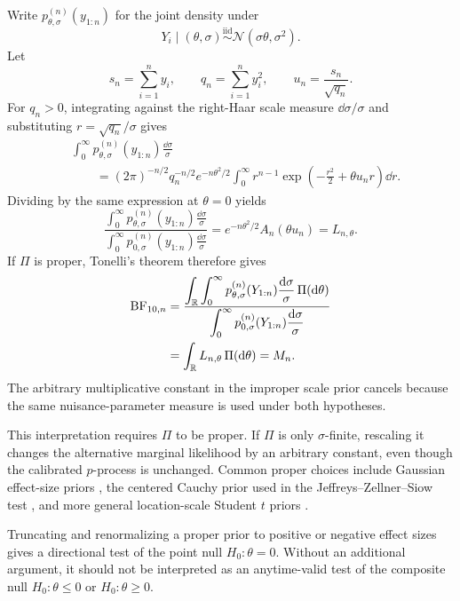 Write \(p_{\theta,\sigma}^{(n)}(y_{1:n})\) for the joint density under
\[
  Y_i\mid(\theta,\sigma)
  \stackrel{\mathrm{iid}}{\sim}
  \mathcal N(\sigma\theta,\sigma^2).
\]
Let
\[
  s_n=\sum_{i=1}^n y_i,
  \qquad
  q_n=\sum_{i=1}^n y_i^2,
  \qquad
  u_n=\frac{s_n}{\sqrt{q_n}}.
\]
For \(q_n>0\), integrating against the right-Haar scale measure
\(\dd\sigma/\sigma\) and substituting \(r=\sqrt{q_n}/\sigma\) gives
\begin{align*}
  &\int_0^\infty
  p_{\theta,\sigma}^{(n)}(y_{1:n})
  \frac{\dd\sigma}{\sigma}
  \\
  &\qquad=
  (2\pi)^{-n/2}q_n^{-n/2}e^{-n\theta^2/2}
  \int_0^\infty
  r^{n-1}
  \exp\left(-\frac{r^2}{2}+\theta u_n r\right)
  \dd r.
\end{align*}
Dividing by the same expression at \(\theta=0\) yields
\[
  \frac{
    \int_0^\infty
    p_{\theta,\sigma}^{(n)}(y_{1:n})
    \frac{\dd\sigma}{\sigma}
  }{
    \int_0^\infty
    p_{0,\sigma}^{(n)}(y_{1:n})
    \frac{\dd\sigma}{\sigma}
  }
  =
  e^{-n\theta^2/2}A_n(\theta u_n)
  =L_{n,\theta}.
\]
If \(\Pi\) is proper, Tonelli's theorem therefore gives
\begin{align}
  \mathrm{BF}_{10,n}
  &=
  \frac{
    \displaystyle
    \int_{\mathbb R}\int_0^\infty
    p_{\theta,\sigma}^{(n)}(Y_{1:n})
    \frac{\mathrm{d}\sigma}{\sigma}\,
    \Pi(\mathrm{d}\theta)
  }{
    \displaystyle
    \int_0^\infty
    p_{0,\sigma}^{(n)}(Y_{1:n})
    \frac{\mathrm{d}\sigma}{\sigma}
  }
  \notag\\
  &=
  \int_{\mathbb R}L_{n,\theta}\,\Pi(\mathrm{d}\theta)
  =M_n.
  \label{eq:bayes-factor-mixture}
\end{align}
The arbitrary multiplicative constant in the improper scale prior
cancels because the same nuisance-parameter measure is used under both
hypotheses.

This interpretation requires \(\Pi\) to be proper. If \(\Pi\) is only
\(\sigma\)-finite, rescaling it changes the alternative marginal
likelihood by an arbitrary constant, even though the calibrated
\(p\)-process is unchanged. Common proper choices include Gaussian
effect-size priors \citep{Gonen2005}, the centered Cauchy prior used in
the Jeffreys--Zellner--Siow test \citep{Rouder2009}, and more general
location-scale Student \(t\) priors \citep{Gronau2020}.

Truncating and renormalizing a proper prior to positive or negative
effect sizes gives a directional test of the point null
\(H_0:\theta=0\). Without an additional argument, it should not be
interpreted as an anytime-valid test of the composite null
\(H_0:\theta\leq0\) or \(H_0:\theta\geq0\).


